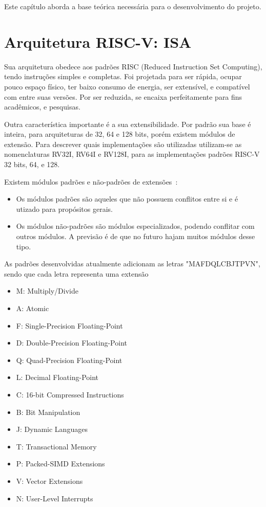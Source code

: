 Este capítulo aborda a base teórica necessária para o desenvolvimento do projeto.

\section{Arquitetura RISC-V: ISA}

	Sua arquitetura obedece aos padrões RISC (Reduced Instruction Set Computing), tendo instruções simples e completas. Foi projetada para ser rápida, ocupar pouco espaço físico, ter baixo consumo de energia, ser extensível, e compatível com entre suas versões. Por ser reduzida, se encaixa perfeitamente para fins acadêmicos, e pesquisas. 

	Outra característica importante é a sua extensibilidade. Por padrão sua base é inteira, para arquiteturas de 32, 64 e 128 bits, porém existem módulos de extensão. Para descrever quais implementações são utilizadas utilizam-se as nomenclaturas RV32I, RV64I e RV128I, para as implementações padrões RISC-V 32 bits, 64, e 128.

	Existem módulos padrões e não-padrões de extensões~\cite{riscv_spec}:

		\begin{itemize}
			\item Os módulos padrões são aqueles que não possuem conflitos entre si e é utizado para propósitos gerais.
			\item Os módulos não-padrões são módulos especializados, podendo conflitar com outros módulos. A previsão é de que no futuro hajam muitos módulos desse tipo.
		\end{itemize}

	As padrões desenvolvidas atualmente adicionam as letras "MAFDQLCBJTPVN", sendo que cada letra representa uma extensão

		\begin{itemize}
			\item M: Multiply/Divide
			\item A: Atomic
			\item F: Single-Precision Floating-Point
			\item D: Double-Precision Floating-Point
			\item Q: Quad-Precision Floating-Point
			\item L: Decimal Floating-Point
			\item C: 16-bit Compressed Instructions
			\item B: Bit Manipulation
			\item J: Dynamic Languages
			\item T: Transactional Memory
			\item P: Packed-SIMD Extensions
			\item V: Vector Extensions 
			\item N: User-Level Interrupts 
		\end{itemize}

